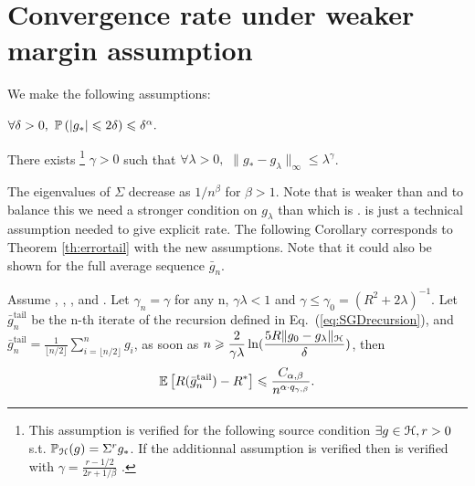 \section{Convergence rate under weaker margin assumption}
\label{ap:weakmargin}

We make the following assumptions: 

\bas \label{asm:wseparability} $\forall \delta > 0, \ \P \left( | g_* | \leqslant 2\delta \right) \leqslant \delta^\alpha.$ \eas

\bas \label{asm:sflambda-correct-sign} There exists \footnote{This assumption is verified for the following source condition $\exists g \in \H, r>0$ s.t. $\P_\H(g) = \Sigma^r g_*$. 
If the additionnal assumption  is verified then  is verified with $\gamma = \frac{r-1/2}{2r+1/\beta}$ \citep{caponnetto2007optimal}.} 
$\gamma > 0$ such that $\forall \lambda > 0, $ $\|g_* - g_\lambda\|_\infty \leqslant \lambda^\gamma$.  \eas

\bas \label{asm:eigenvalues} The eigenvalues of $\Sigma$ decrease as $1/n^\beta$ for $\beta > 1$. \eas
%
Note that  is weaker than  and to balance this we need a stronger condition on $g_\lambda$ than  which is .  is just a technical assumption needed to give explicit rate. The following Corollary corresponds to Theorem \ref{th:errortail} with the new assumptions. Note that it could also be shown for the full average sequence $\bar{g}_n$.
 
\begin{corollary}
\label{co:weakmargin}
Assume , , \- ,  and . Let $\gamma_n = \gamma$ for any n, $\gamma\lambda < 1$ and $\gamma \leqslant \gamma_0 = (R^2 + 2\lambda)^{-1}$. Let $\bar{g}_n^{\textrm {tail}}$ be the n-th iterate of the recursion defined in Eq.~(\ref{eq:SGDrecursion}), and $\bar{g}_n^{\textrm {tail}} = \frac{1}{\lfloor n/2 \rfloor} \sum_{i=\lfloor n/2 \rfloor}^{n} g_i$, as soon as $\displaystyle n \geqslant \frac{2}{\gamma\lambda}\ln (\frac{5R \|g_0-g_\lambda\|_\H}{\delta})$, then 
$$ \E \left[ R(\bar{g}_n^{\textrm {tail}}) - R^* \right] \leqslant \frac{C_{\alpha,\beta}}{n^{\alpha\cdot q_{\gamma,\beta} }}.$$ 
\end{corollary}


